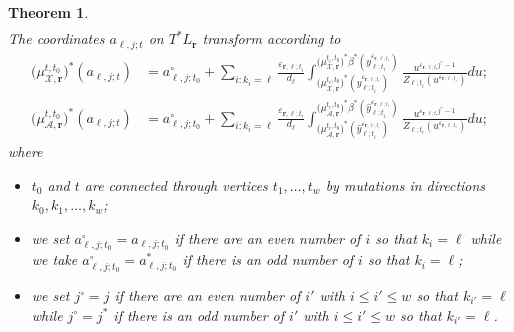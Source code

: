 \documentclass{amsart}
\newtheorem{theorem}{Theorem}[section]
\numberwithin{equation}{section}
\newcommand{\bfr}{{\boldsymbol{r}}}
\newcommand{\cA}{\mathcal{A}}
\newcommand{\cX}{\mathcal{X}}
\begin{document}
\begin{theorem}
\begin{align}
  \end{align}
  The coordinates $a_{\ell,j;t}$ on $T^*L_\bfr$ transform according to
  \begin{align}
    \label{eq:cotangent mutations}
    \big(\mu_{\cX,\bfr}^{t,t_0}\big)^*(a_{\ell,j;t})&=a^\circ_{\ell,j;t_0}+\sum_{i:k_i=\ell} \frac{\varepsilon_{\bfr,\ell;t_i}}{d_\ell} \int_{\big(\mu_{\cX,\bfr}^{t_i,t_0}\big)^*(y_{\ell;t_i}^{\varepsilon_{\bfr,\ell;t_i}})}^{\big(\mu_{\cX,\bfr}^{t_i,t_0}\big)^*\beta^*(y_{\ell;t_i}^{\varepsilon_{\bfr,\ell;t_i}})} \frac{u^{\varepsilon_{\bfr,\ell;t_i} j^\circ-1}}{Z_{\ell;t_i}(u^{\varepsilon_{\bfr,\ell;t_i}})}du;\\
    \big(\mu_{\cA,\bfr}^{t,t_0}\big)^*(a_{\ell,j;t})&=a^\circ_{\ell,j;t_0}+\sum_{i:k_i=\ell} \frac{\varepsilon_{\bfr,\ell;t_i}}{d_\ell} \int_{\big(\mu_{\cA,\bfr}^{t_i,t_0}\big)^*(\hat y_{\ell;t_i}^{\varepsilon_{\bfr,\ell;t_i}})}^{\big(\mu_{\cA,\bfr}^{t_i,t_0}\big)^*\beta^*(\hat y_{\ell;t_i}^{\varepsilon_{\bfr,\ell;t_i}})} \frac{u^{\varepsilon_{\bfr,\ell;t_i} j^\circ-1}}{Z_{\ell;t_i}(u^{\varepsilon_{\bfr,\ell;t_i}})}du;
  \end{align}
  where 
  \begin{itemize}
    \item $t_0$ and $t$ are connected through vertices $t_1,\ldots,t_w$ by mutations in directions $k_0,k_1,\ldots,k_w$;
    \item we set $a^\circ_{\ell,j;t_0}=a_{\ell,j;t_0}$ if there are an even number of $i$ so that $k_i=\ell$ while we take $a^\circ_{\ell,j;t_0}=a^*_{\ell,j;t_0}$ if there is an odd number of $i$ so that $k_i=\ell$;
    \item we set $j^\circ=j$ if there are an even number of $i'$ with $i\le i'\le w$ so that $k_{i'}=\ell$ while $j^\circ=j^*$ if there is an odd number of $i'$ with $i\le i'\le w$ so that $k_{i'}=\ell$.
  \end{itemize}
\end{theorem}
\end{document}
